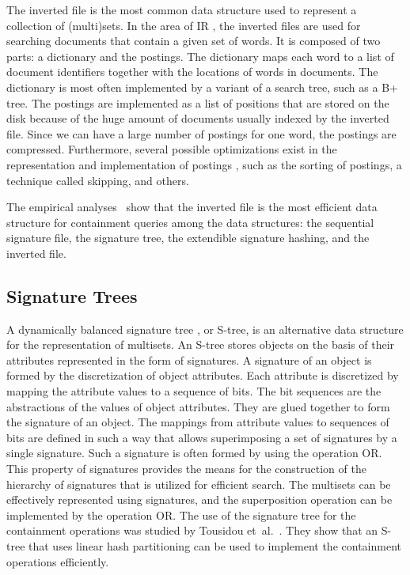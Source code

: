 \documentclass[algorithms,article,accept,pdftex,moreauthors]{Definitions/mdpi}
\begin{document}
The inverted file \cite{zobel1992efficient,zobel1998inverted,zobel2006inverted} is the most common data structure used to represent a collection of (multi)sets. In the area of IR \cite{manning2008introduction}, the inverted files are used for searching documents that contain a given set of words. It is composed of two parts: a dictionary and the postings. The dictionary maps each word to a list of document identifiers together with the locations of words in documents. The dictionary is most often implemented by a variant of a search tree, such as a B+ tree. The postings are implemented as a list of positions that are stored on the disk because of the huge amount of documents usually indexed by the inverted file. Since we can have a large number of postings for one word, the postings are compressed. Furthermore, several possible optimizations exist in the representation and implementation of postings \cite{zobel2006inverted}, such as the sorting of postings, a technique called skipping, and others.

The empirical analyses~\cite{Helmer2003,zobel1998inverted} show that the inverted file is the most efficient data structure for containment queries among the data structures: the sequential signature file, the signature tree, the extendible signature hashing, and the inverted file. 


\subsection{Signature Trees\label{rel-signature}}

A dynamically balanced signature tree \cite{Deppisch1986,Pfaltz1980}, or S-tree, is an alternative data structure for the representation of multisets. An S-tree stores objects on the basis of their attributes represented in the form of signatures. A signature of an object is formed by the discretization of object attributes. Each attribute is discretized by mapping the attribute values to a sequence of bits. The bit sequences are the abstractions of the values of object attributes. They are glued together to form the signature of an object. The mappings from attribute values to sequences of bits are defined in such a way that allows superimposing a set of signatures by a single signature. Such a signature is often formed by using the operation OR. This property of signatures provides the means for the construction of the hierarchy of signatures that is utilized for efficient search. The multisets can be effectively represented using signatures, and the superposition operation can be implemented by the operation OR. The use of the signature tree for the containment operations was studied by Tousidou et~al.~\cite{tousidou2002sigstruc}. They show that an S-tree that uses linear hash partitioning can be used to implement the containment operations efficiently. 
\end{document}
